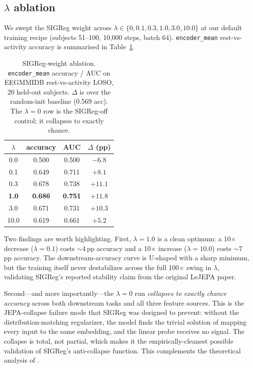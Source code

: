 \subsection{$\lambda$ ablation}
\label{sec:results:lambda}

We swept the SIGReg weight across
$\lambda \in \{0, 0.1, 0.3, 1.0, 3.0, 10.0\}$ at our default training
recipe (subjects 51--100, 10{,}000 steps, batch 64).
\texttt{encoder\_mean} rest-vs-activity accuracy is summarised in
Table~\ref{tab:lambda}.

\begin{table}[t]
\caption{SIGReg-weight ablation. \texttt{encoder\_mean} accuracy / AUC on
EEGMMIDB rest-vs-activity LOSO, 20 held-out subjects. $\Delta$ is over the
random-init baseline (0.569 acc). The $\lambda{=}0$ row is the SIGReg-off
control; it collapses to exactly chance.}
\label{tab:lambda}
\centering
\small
\begin{tabular}{c c c c}
\toprule
$\lambda$ & accuracy & AUC & $\Delta$ (pp) \\
\midrule
0.0   & 0.500 & 0.500 & $-6.8$ \\
0.1   & 0.649 & 0.711 & $+8.1$  \\
0.3   & 0.678 & 0.738 & $+11.1$  \\
\textbf{1.0} & \textbf{0.686} & \textbf{0.751} & \textbf{$+11.8$} \\
3.0   & 0.671 & 0.731 & $+10.3$  \\
10.0  & 0.619 & 0.661 & $+5.2$  \\
\bottomrule
\end{tabular}
\end{table}

Two findings are worth highlighting. First, $\lambda{=}1.0$ is a clean
optimum: a 10$\times$ decrease ($\lambda{=}0.1$) costs $\sim$4\,pp accuracy
and a 10$\times$ increase ($\lambda{=}10.0$) costs $\sim$7\,pp accuracy.
The downstream-accuracy curve is U-shaped with a sharp minimum, but the
training itself never destabilizes across the full 100$\times$ swing in
$\lambda$, validating SIGReg's reported stability claim from the original
LeJEPA paper.

Second---and more importantly---the $\lambda{=}0$ run \emph{collapses to
exactly chance accuracy} across both downstream tasks and all three
feature sources. This is the JEPA-collapse failure mode that SIGReg was
designed to prevent: without the distribution-matching regularizer, the
model finds the trivial solution of mapping every input to the same
embedding, and the linear probe receives no signal. The collapse is
total, not partial, which makes it the empirically-cleanest possible
validation of SIGReg's anti-collapse function. This complements the
theoretical analysis of \cite{lejepa2025}.

